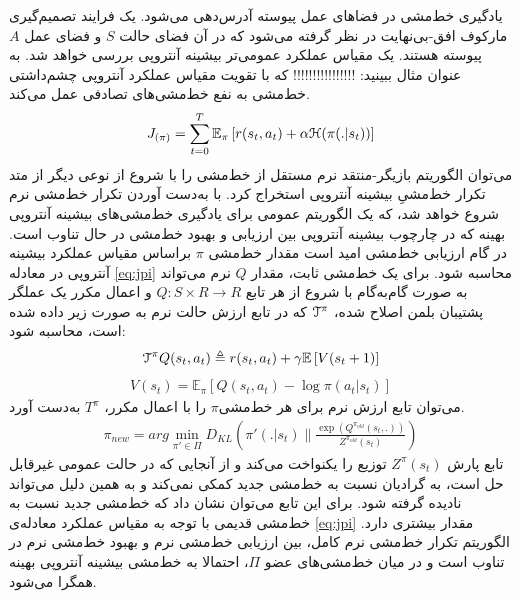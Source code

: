 یادگیری خط‌مشی در فضاهای عمل پیوسته آدرس‌دهی می‌شود. یک فرایند تصمیم‌گیری مارکوف افق-بی‌نهایت
 در نظر گرفته می‌شود که در آن فضای حالت
  $S$
   و فضای عمل
   $A$
    پیوسته هستند.
یک مقیاس عملکرد عمومی‌تر بیشینه آنتروپی بررسی خواهد شد.
به عنوان مثال ببینید: 
!!!!!!!!!!!!!!!!
که با تقویت مقیاس عملکرد آنتروپی چشم‌داشتی خط‌مشی به نفع خط‌مشی‌های تصادفی عمل می‌کند.
\begin{align}
J_{(\pi)}= \sum\limits_{t=0}^T \mathbb{E}_\pi \left[ r(s_t , a_t) + \alpha \EuScript{H} (\pi(.|s_t)) \right]
\label{eq:jpi}
\end{align}
می‌توان الگوریتم بازیگر-منتقد نرم مستقل از خط‌مشی را با شروع از نوعی دیگر از متد تکرار خط‌مشیِ بیشینه آنتروپی استخراج کرد.
با به‌دست آوردن تکرار خط‌مشی نرم شروع خواهد شد، که یک الگوریتم عمومی برای یادگیری خط‌مشی‌های بیشینه آنتروپی بهینه که در چارچوب بیشینه آنتروپی بین ارزیابی و بهبود خط‌مشی در حال تناوب است.
در گام ارزیابی خط‌مشی امید است مقدار خط‌مشی
$\pi$
 براساس مقیاس عملکرد بیشینه آنتروپی در معادله \ref{eq:jpi} محاسبه شود. برای یک خط‌مشی ثابت، مقدار $Q$  نرم می‌تواند به صورت گام‌به‌گام با شروع از هر تابع
  $Q:S \times R \rightarrow R$ 
 و اعمال مکرر یک عملگر پشتیبان بلمن اصلاح شده،
 $\EuScript{T}^\pi$
  که در تابع ارزش حالت نرم به صورت زیر داده شده است، محاسبه شود:
\begin{align}
\EuScript{T}^\pi Q(s_t,a_t) \triangleq r(s_t,a_t)+\gamma \mathbb{E} \left[ V(s_t+1) \right]
\label{eq:tpi}
\end{align}
\begin{align}
V(s_t)= \mathbb{E}_\pi \left[ Q(s_t,a_t)- \log \pi(a_t | s_t) \right]
\end{align}
می‌توان تابع ارزش نرم برای هر خط‌مشی$\pi$ را با اعمال مکرر، $T^\pi$ به‌دست آورد.
\begin{align}
\pi_{new} = arg \min_{\pi' \in \Pi} D_{KL}  \left( \pi'(.|s_t) \parallel \frac{\exp{(Q^{\pi_{old}} (s_t,.))}}{Z^{\pi_{old}} (s_t)}\right)
\label{eq:pinew}
\end{align}
تابع پارش 
$Z^\pi (s_t)$
توزیع را یکنواخت می‌کند و از آنجایی که در حالت عمومی غیرقابل حل است، به گرادیان نسبت به خط‌مشی جدید کمکی نمی‌کند و به همین دلیل می‌تواند نادیده گرفته شود. برای این تابع می‌توان نشان داد که خط‌مشی جدید نسبت به خط‌مشی قدیمی با توجه به مقیاس عملکرد معادله‌ی \ref{eq:jpi} مقدار بیشتری دارد. 
الگوریتم تکرار خط‌مشی نرم کامل، بین ارزیابی خط‌مشی نرم و بهبود خط‌مشی نرم در تناوب است و در میان خط‌مشی‌های عضو
$\Pi$،
احتمالا به خط‌مشی بیشینه آنتروپی بهینه همگرا می‌شود.
